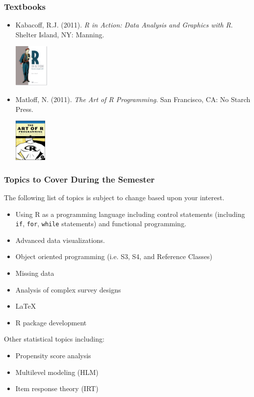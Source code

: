 \documentclass[10pt,slidestop,mathserif,c]{beamer}
\begin{document}
\begin{frame}[fragile]
	\frametitle{Textbooks}
	\begin{itemize}
		\item Kabacoff, R.J. (2011). \textit{R in Action: Data Analysis and Graphics with R}. Shelter Island, NY: Manning. \\
		\begin{center}\includegraphics[keepaspectratio,height=80px]{figures/rinaction.jpg}\end{center}
		\item Matloff, N. (2011). \textit{The Art of R Programming}. San Francisco, CA: No Starch Press.\\
		\begin{center}\includegraphics[keepaspectratio,height=80px]{figures/theartofrprogramming.jpg}\end{center}
	\end{itemize}
\end{frame}

\begin{frame}[fragile]
	\frametitle{Topics to Cover During the Semester}
	The following list of topics is subject to change based upon your interest. 
	\begin{itemize}
		\item Using R as a programming language including control statements (including \texttt{if}, \texttt{for}, \texttt{while} statements) and functional programming.
		\item Advanced data visualizations.
		\item Object oriented programming (i.e. S3, S4, and Reference Classes)
		\item Missing data
		\item Analysis of complex survey designs
		\item \LaTeX{}
		\item R package development\\
	\end{itemize}
	\pause
	Other statistical topics including:
	\begin{itemize}
		\item Propensity score analysis
		\item Multilevel modeling (HLM)
		\item Item response theory (IRT)
	\end{itemize}
\end{frame}
\end{document}
